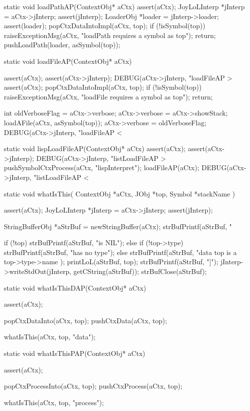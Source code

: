 \startCCode
static void loadPathAP(ContextObj* aCtx) {
  assert(aCtx);
  JoyLoLInterp *jInterp = aCtx->jInterp;
  assert(jInterp);
  LoaderObj *loader = jInterp->loader;
  assert(loader);
  popCtxDataIntoImpl(aCtx, top);
  if (!isSymbol(top)) {
    raiseExceptionMsg(aCtx,
      "loadPath requires a symbol as top");
    return;
  }
  pushLoadPath(loader, asSymbol(top));
}
\stopCCode

\startCCode
static void loadFileAP(ContextObj* aCtx) {
  assert(aCtx);
  assert(aCtx->jInterp);
  DEBUG(aCtx->jInterp, "loadFileAP > %
  assert(aCtx);
  popCtxDataIntoImpl(aCtx, top);
  if (!isSymbol(top)) {
    raiseExceptionMsg(aCtx,
      "loadFile requires a symbol as top");
    return;
  }
  
  int oldVerboseFlag = aCtx->verbose;
  aCtx->verbose = aCtx->showStack;
  loadAFile(aCtx, asSymbol(top));
  aCtx->verbose = oldVerboseFlag;
  DEBUG(aCtx->jInterp, "loadFileAP < %
}
\stopCCode

\startCCode
static void lispLoadFileAP(ContextObj* aCtx) {
  assert(aCtx);
  assert(aCtx->jInterp);
  DEBUG(aCtx->jInterp, "listLoadFileAP > %
  pushSymbolCtxProcess(aCtx, "lispInterpret");
  loadFileAP(aCtx);
  DEBUG(aCtx->jInterp, "listLoadFileAP < %
}
\stopCCode

\startCCode
static void whatIsThis(
  ContextObj *aCtx,
  JObj       *top,
  Symbol     *stackName
) {
  assert(aCtx);
  JoyLoLInterp *jInterp = aCtx->jInterp;
  assert(jInterp);
  
  StringBufferObj *aStrBuf = newStringBuffer(aCtx);
  strBufPrintf(aStrBuf, "%

  if (!top) {
    strBufPrintf(aStrBuf, "is NIL\n");
  } else {
    if (!top->type) {
      strBufPrintf(aStrBuf, "has no type\n");
    } else {
      strBufPrintf(aStrBuf,
        "data top is a %
        top->type->name
      );
      printLoL(aStrBuf, top);
      strBufPrintf(aStrBuf, "]\n");
    }
  }
  jInterp->writeStdOut(jInterp, getCString(aStrBuf));
  strBufClose(aStrBuf);      
}

static void whatIsThisDAP(ContextObj* aCtx) {
  assert(aCtx);
  
  popCtxDataInto(aCtx, top);
  pushCtxData(aCtx, top);
  
  whatIsThis(aCtx, top, "data");
}

static void whatIsThisPAP(ContextObj* aCtx) {
  assert(aCtx);
  
  popCtxProcessInto(aCtx, top);
  pushCtxProcess(aCtx, top);
  
  whatIsThis(aCtx, top, "process");
}
\stopCCode

